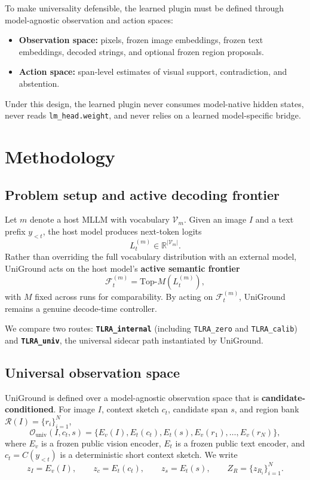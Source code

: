 To make universality defensible, the learned plugin must be defined through model-agnostic observation and action spaces:
\begin{itemize}
  \item \textbf{Observation space:} pixels, frozen image embeddings, frozen text embeddings, decoded strings, and optional frozen region proposals.
  \item \textbf{Action space:} span-level estimates of visual support, contradiction, and abstention.
\end{itemize}

Under this design, the learned plugin never consumes model-native hidden states, never reads \texttt{lm\_head.weight}, and never relies on a learned model-specific bridge.

\section{Methodology}
\label{sec:method}

\subsection{Problem setup and active decoding frontier}

Let $m$ denote a host MLLM with vocabulary $\mathcal{V}_m$. Given an image $I$ and a text prefix $y_{<t}$, the host model produces next-token logits
\[
L_t^{(m)} \in \mathbb{R}^{|\mathcal{V}_m|}.
\]
Rather than overriding the full vocabulary distribution with an external model, UniGround acts on the host model's \textbf{active semantic frontier}
\[
\mathcal{F}_t^{(m)} = \mathrm{Top}\text{-}M\!\left(L_t^{(m)}\right),
\]
with $M$ fixed across runs for comparability. By acting on $\mathcal{F}_t^{(m)}$, UniGround remains a genuine decode-time controller.

We compare two routes: \textbf{\texttt{TLRA\_internal}} (including \texttt{TLRA\_zero} and \texttt{TLRA\_calib}) and \textbf{\texttt{TLRA\_univ}}, the universal sidecar path instantiated by UniGround.

\subsection{Universal observation space}

UniGround is defined over a model-agnostic observation space that is \textbf{candidate-conditioned}. For image $I$, context sketch $c_t$, candidate span $s$, and region bank $\mathcal{R}(I)=\{r_i\}_{i=1}^N$,
\[
\mathcal{O}_{\mathrm{univ}}(I, c_t, s)
= \{E_v(I), E_t(c_t), E_t(s), E_v(r_1), \dots, E_v(r_N)\},
\]
where $E_v$ is a frozen public vision encoder, $E_t$ is a frozen public text encoder, and $c_t = C(y_{<t})$ is a deterministic short context sketch. We write
\[
z_I = E_v(I), \qquad z_c = E_t(c_t), \qquad z_s = E_t(s), \qquad Z_R = \{z_{R_i}\}_{i=1}^N.
\]

